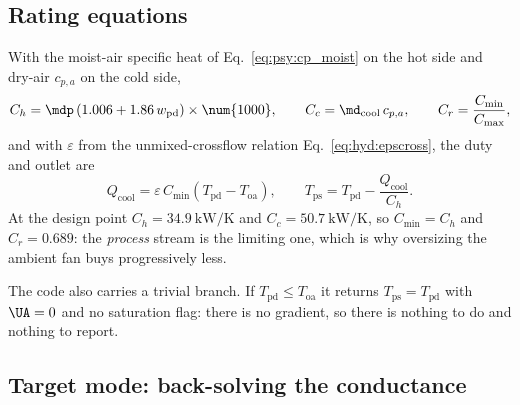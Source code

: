 \subsection{Rating equations}
\label{sec:air:coolerrate}

With the moist-air specific heat of Eq.~\eqref{eq:psy:cp_moist} on the hot side
and dry-air $c_{p,a}$ on the cold side,
\begin{equation}
C_h = \mdp\left(1.006 + 1.86\,w_{\mathrm{pd}}\right)\times\num{1000},
\qquad
C_c = \md_{\mathrm{cool}}\,c_{p,a},
\qquad
C_r = \frac{C_{\min}}{C_{\max}} ,
\label{eq:air:caprates}
\end{equation}
and with $\varepsilon$ from the unmixed-crossflow relation
Eq.~\eqref{eq:hyd:epscross}, the duty and outlet are
\begin{equation}
Q_{\mathrm{cool}} = \varepsilon\,C_{\min}
\left(T_{\mathrm{pd}}-T_{\mathrm{oa}}\right),
\qquad
T_{\mathrm{ps}} = T_{\mathrm{pd}} - \frac{Q_{\mathrm{cool}}}{C_h} .
\label{eq:air:cooler_rate}
\end{equation}
At the design point $C_h=\SI{34.9}{\kilo\watt\per\kelvin}$ and
$C_c=\SI{50.7}{\kilo\watt\per\kelvin}$, so $C_{\min}=C_h$ and $C_r=0.689$: the
\emph{process} stream is the limiting one, which is why oversizing the ambient
fan buys progressively less.

The code also carries a trivial branch. If $T_{\mathrm{pd}}\le T_{\mathrm{oa}}$
it returns $T_{\mathrm{ps}}=T_{\mathrm{pd}}$ with $\UA=0$ and no saturation
flag: there is no gradient, so there is nothing to do and nothing to report.

\subsection{Target mode: back-solving the conductance}
\label{sec:air:target}


